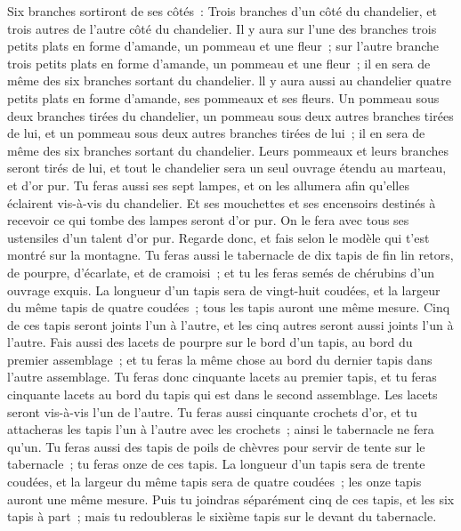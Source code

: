 \begin{multicols}{2}
Six branches sortiront de ses côtés~: Trois branches d'un côté du chandelier, et trois autres de l'autre côté du chandelier.
Il y aura sur l'une des branches trois petits plats en forme d'amande, un pommeau et une fleur~; sur l'autre branche trois petits plats en forme d'amande, un pommeau et une fleur~; il en sera de même des six branches sortant du chandelier.
ll y aura aussi au chandelier quatre petits plats en forme d'amande, ses pommeaux et ses fleurs.
Un pommeau sous deux branches tirées du chandelier, un pommeau sous deux autres branches tirées de lui, et un pommeau sous deux autres branches tirées de lui~; il en sera de même des six branches sortant du chandelier.
Leurs pommeaux et leurs branches seront tirés de lui, et tout le chandelier sera un seul ouvrage étendu au marteau, et d'or pur.
Tu feras aussi ses sept lampes, et on les allumera afin qu'elles éclairent vis-à-vis du chandelier.
Et ses mouchettes et ses encensoirs destinés à recevoir ce qui tombe des lampes seront d'or pur.
On le fera avec tous ses ustensiles d'un talent d'or pur.
Regarde donc, et fais selon le modèle qui t'est montré sur la montagne.
\VerseOne{}Tu feras aussi le tabernacle de dix tapis de fin lin retors, de pourpre, d'écarlate, et de cramoisi~; et tu les feras semés de chérubins d'un ouvrage exquis.
La longueur d'un tapis sera de vingt-huit coudées, et la largeur du même tapis de quatre coudées~; tous les tapis auront une même mesure.
Cinq de ces tapis seront joints l'un à l'autre, et les cinq autres seront aussi joints l'un à l'autre.
Fais aussi des lacets de pourpre sur le bord d'un tapis, au bord du premier assemblage~; et tu feras la même chose au bord du dernier tapis dans l'autre assemblage.
Tu feras donc cinquante lacets au premier tapis, et tu feras cinquante lacets au bord du tapis qui est dans le second assemblage. Les lacets seront vis-à-vis l'un de l'autre.
Tu feras aussi cinquante crochets d'or, et tu attacheras les tapis l'un à l'autre avec les crochets~; ainsi le tabernacle ne fera qu'un.
Tu feras aussi des tapis de poils de chèvres pour servir de tente sur le tabernacle~; tu feras onze de ces tapis.
La longueur d'un tapis sera de trente coudées, et la largeur du même tapis sera de quatre coudées~; les onze tapis auront une même mesure.
Puis tu joindras séparément cinq de ces tapis, et les six tapis à part~; mais tu redoubleras le sixième tapis sur le devant du tabernacle.

\end{multicols}
